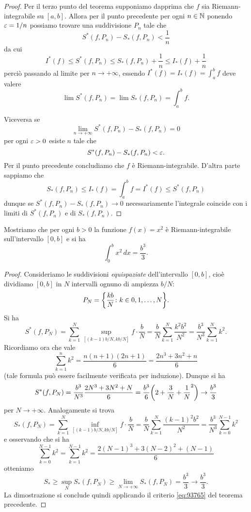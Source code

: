 \begin{proof}
Per il terzo punto del teorema
supponiamo dapprima che $f$ sia Riemann-integrabile su $[a,b]$.
Allora per il punto precedente per ogni $n\in \mathbb N$ ponendo $\varepsilon=1/n$ possiamo trovare una suddivisione $P_n$ tale che
\[
  S^*(f,P_n) - S_*(f,P_n) < \frac 1 n
\]
da cui
\[
  I^*(f) \le S^*(f,P_n) \le S_*(f,P_n) + \frac 1 n
   \le I_*(f) + \frac 1 n
\]
perciò passando al limite per $n\to +\infty$,
essendo $I^*(f) = I_*(f) = \int_a^b f$ deve valere
\[
  \lim S^*(f,P_n) = \lim S_*(f,P_n) = \int_a^b f.
\]

Viceversa se
\[
 \lim_{n\to +\infty} S^*(f,P_n) - S_*(f,P_n) = 0
\]
per ogni $\varepsilon>0$ esiste $n$ tale che
\[
  S^*(f,P_n) - S_*(f,P_n) < \varepsilon.
\]
Per il punto precedente concludiamo che $f$ è Riemann-integrabile.
D'altra parte sappiamo che
\[
  S_*(f,P_n) \le I_*(f) = \int_a^b f = I^*(f) \le S^*(f,P_n)
\]
dunque se $S^*(f,P_n) - S_*(f,P_n) \to 0$ necessariamente
l'integrale coincide con i limiti di $S^*(f,P_n)$ e di
$S_*(f,P_n)$.
\end{proof}

\begin{example}
\label{ex:integrale_quadrato}
Mostriamo che per ogni $b>0$ la funzione $f(x)=x^2$ è Riemann-integrabile sull'intervallo $[0,b]$ e si ha
\[
 \int_0^b x^2\, dx = \frac{b^3}{3}.
\]
\end{example}
\begin{proof}
Consideriamo le suddivisioni \emph{equispaziate} dell'intervallo $[0,b]$, cioè dividiamo $[0,b]$ in $N$ intervalli ognuno di ampiezza $b/N$:
\[
P_N = {\left\{ \frac{kb}{N}\colon k \in 0, 1, \dots, N \right\}}.
\]
Si ha
\[
  S^*(f,P_N) = \sum_{k=1}^N \sup_{[(k-1)b/N,kb/N]}f \cdot \frac b N
   = \frac{b}{N} \sum_{k=1}^N \frac{k^2b^2}{N^2}
   = \frac{b^3}{N^3} \sum_{k=1}^N k^2.
\]
Ricordiamo ora che vale
\[
  \sum_{k=1}^n k^2 = \frac{n(n+1)(2n+1)}{6} = \frac{2n^3+3n^2+n}{6}
\]
(tale formula può essere facilmente verificata per induzione). Dunque si ha
\[
  S^*(f,P_N) = \frac{b^3}{N^3} \frac{2N^3+3N^2+N}{6}
       = \frac{b^3}{6}{\left( 2 + \frac{3}{N}+\frac 1 N^2 \right)}
       \to \frac{b^3}{3}
\]
per $N\to +\infty$.
Analogamente si trova
\[
  S_*(f,P_N) = \sum_{k=1}^N \inf_{[(k-1)b/N,kb/N]} f \cdot \frac{b}{N}
  = \frac{b}{N}\sum_{k=1}^N \frac{(k-1)^2b^2}{N^2}
  = \frac{b^3}{N^3} \sum_{k=0}^{N-1} k^2
\]
e osservando che si ha
\[
 \sum_{k=0}^{N-1} k^2 = \sum_{k=1}^{N-1} k^2 = \frac{2(N-1)^3+3(N-2)^2+(N-1)}{6}
\]
otteniamo
\[
 S_*\ge \sup_N S_*(f,P_N) \ge \lim_{N\to+\infty} S_*(f,P_N) = \frac{b^3}{3} \to \frac{b^3}{3}.
\]
La dimostrazione si conclude quindi applicando
il criterio \eqref{eq:93765} del teorema precedente.
\end{proof}

